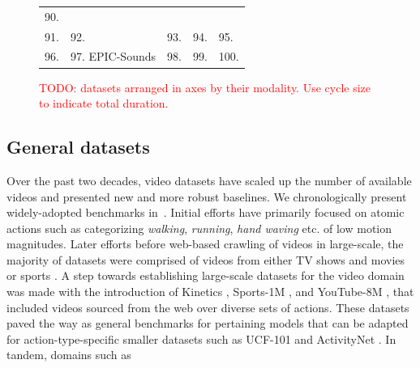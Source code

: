\documentclass[smallextended,twocolumn,natbib]{svjour3}
\begin{document}
\begin{figure}[t]
{\begin{tabular}{lllll}
      90. \citet{liu2022fineaction} \\
      91. \citet{zhou2022audio} &
      92. \citet{li2022neural} &
      93. \citet{sener2022assembly101} &
      94. \citet{grauman2022ego4d} &
      95. \citet{sener2022assembly101} \\
      96. \citet{grauman2024ego} & 
      97. EPIC-Sounds \citep{huh2023epic} &
      98. \citet{li2024mvbench} &
      99. \citet{dwibedi2024ovr} &
      100. \citet{yang2024vidchapters}
    \end{tabular}
    }
    \caption{\textcolor{red}{TODO: datasets arranged in axes by their modality. Use cycle size to indicate total duration.}}
\end{figure}

\subsection{General datasets}
\label{sec:datasets::general}
Over the past two decades, video datasets have scaled up the number of available videos and presented new and more robust baselines. We chronologically present widely-adopted benchmarks in~. Initial efforts \citep{schuldt2004recognizing,gorelick2007actions} have primarily focused on atomic actions such as categorizing \emph{walking}, \emph{running}, \emph{hand waving} etc. of low motion magnitudes. Later efforts before web-based crawling of videos in large-scale, the majority of datasets were comprised of videos from either TV shows and movies \citep{laptev2007retrieving,laptev2008learning,marszalek2009actions,patron2010high,kuehne2011hmdb} or sports \citep{rodriguez2008action,liu2009recognizing,reddy2013recognizing,niebles2010modeling}. A step towards establishing large-scale datasets for the video domain was made with the introduction of Kinetics \citep{carreira2017quo}, Sports-1M \citep{karpathy2014large}, and YouTube-8M \citep{abu2016youtube}, that included videos sourced from the web over diverse sets of actions. These datasets paved the way as general benchmarks for pertaining models that can be adapted for action-type-specific smaller datasets such as UCF-101 \citep{soomro2012ucf101} and ActivityNet \citep{caba2015activitynet}. In tandem, domains such as 
\end{document}

